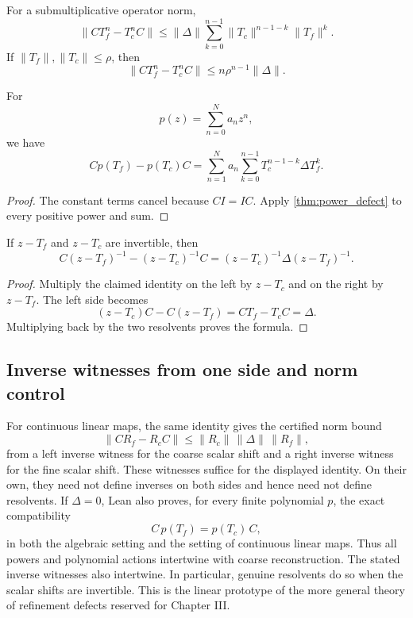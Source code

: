 \begin{corollary}\label{cor:defect-norm}
For a submultiplicative operator norm,
\[
\|CT_f^n-T_c^nC\|
\le
\|\Delta\|
\sum_{k=0}^{n-1}
\|T_c\|^{n-1-k}\|T_f\|^k.
\]
If $\|T_f\|,\|T_c\|\le\rho$, then
\[
\boxed{
\|CT_f^n-T_c^nC\|
\le n\rho^{n-1}\|\Delta\|.
}
\]
\end{corollary}

\begin{corollary}\label{cor:polynomial_defect}
For
\[
p(z)=\sum_{n=0}^Na_nz^n,
\]
we have
\[
Cp(T_f)-p(T_c)C
=
\sum_{n=1}^Na_n
\sum_{k=0}^{n-1}T_c^{n-1-k}\Delta T_f^k.
\]
\end{corollary}

\begin{proof}
The constant terms cancel because $CI=IC$.  Apply \cref{thm:power_defect} to every positive power and sum.
\end{proof}

\begin{theorem}\label{thm:resolvent_defect}\label{thm:resolvent-defect}
If $z-T_f$ and $z-T_c$ are invertible, then
\[
C(z-T_f)^{-1}-(z-T_c)^{-1}C
=
(z-T_c)^{-1}\Delta(z-T_f)^{-1}.
\]
\end{theorem}

\begin{proof}
Multiply the claimed identity on the left by $z-T_c$ and on the right by $z-T_f$.  The left side becomes
\[
(z-T_c)C-C(z-T_f)
=
CT_f-T_cC
=
\Delta.
\]
Multiplying back by the two resolvents proves the formula.
\end{proof}

\subsection{Inverse witnesses from one side and norm control}
For continuous linear maps, the same identity gives the certified norm bound
\[
\boxed{
\|C R_f-R_c C\|
\le \|R_c\|\,\|\Delta\|\,\|R_f\|,
}
\]
from a left inverse witness for the coarse scalar shift and a right inverse
witness for the fine scalar shift. These witnesses suffice for the displayed
identity. On their own, they need not define inverses on both sides and hence
need not define resolvents. If $\Delta=0$, Lean also proves, for every finite
polynomial $p$, the exact compatibility
\[
\boxed{C\,p(T_f)=p(T_c)\,C,}
\]
in both the algebraic setting and the setting of continuous linear maps. Thus
all powers and polynomial actions intertwine with coarse reconstruction. The
stated inverse witnesses also intertwine. In particular, genuine resolvents
do so when the scalar shifts are invertible. This is the linear prototype
of the more general theory of refinement defects reserved for Chapter III.

